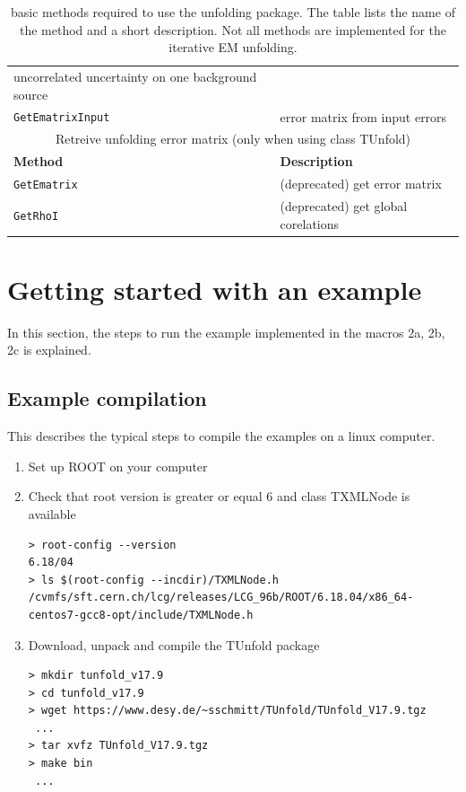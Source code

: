 \documentclass[12pt]{article}
\begin{document}
\begin{table}[ht]
\begin{tabular}{l|p{}}
uncorrelated uncertainty on one background source
 \\
{\tt GetEmatrixInput} & error matrix from input errors
 \\
\hline
\hline
\multicolumn{2}{c}{Retreive unfolding error matrix (only when using class TUnfold)}\\
\hline
{\bf Method} & {\bf Description}
 \\
\hline
{\tt GetEmatrix} & (deprecated) get error matrix 
 \\
{\tt GetRhoI} & (deprecated) get global corelations
 \\
\hline
\end{tabular}
\caption{\label{tab:mainmethods}basic methods required to use the
  unfolding package. The table lists the name of the method and a short
  description. Not all methods are implemented for the iterative EM
  unfolding.}
\end{table}

\section{Getting started with an example}

In this section, the steps to run the example implemented in the macros 2a,
2b, 2c is explained.
\subsection{Example compilation}
This describes the typical steps to compile the examples on a linux
computer.
\begin{enumerate}
\item Set up ROOT on your computer
\item Check that root version is greater or equal 6 and class TXMLNode is available
\begin{verbatim}
> root-config --version
6.18/04
> ls $(root-config --incdir)/TXMLNode.h
/cvmfs/sft.cern.ch/lcg/releases/LCG_96b/ROOT/6.18.04/x86_64-centos7-gcc8-opt/include/TXMLNode.h
\end{verbatim}
\item Download, unpack and compile the TUnfold package
\begin{verbatim}
> mkdir tunfold_v17.9
> cd tunfold_v17.9
> wget https://www.desy.de/~sschmitt/TUnfold/TUnfold_V17.9.tgz
 ...
> tar xvfz TUnfold_V17.9.tgz
> make bin
 ...
\end{verbatim}
\end{enumerate}
\end{document}
